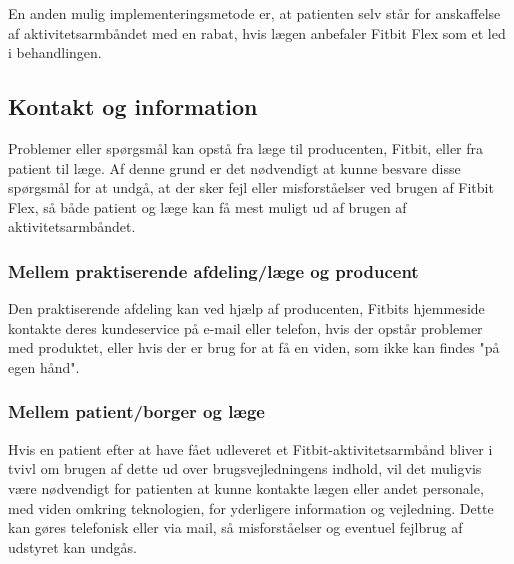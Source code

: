 En anden mulig implementeringsmetode er, at patienten selv står for anskaffelse af aktivitetsarmbåndet med en rabat, hvis lægen anbefaler Fitbit Flex som et led i behandlingen.  

\subsection{Kontakt og information}

Problemer eller spørgsmål kan opstå fra læge til producenten, Fitbit, eller fra patient til læge. Af denne grund er det nødvendigt at kunne besvare disse spørgsmål for at undgå, at der sker fejl eller misforståelser ved brugen af Fitbit Flex, så både patient og læge kan få mest muligt ud af brugen af aktivitetsarmbåndet. 

\subsubsection{Mellem praktiserende afdeling/læge og producent}

Den praktiserende afdeling kan ved hjælp af producenten, Fitbits hjemmeside kontakte deres kundeservice på e-mail eller telefon, hvis der opstår problemer med produktet, eller hvis der er brug for at få en viden, som ikke kan findes "på egen hånd". 

\subsubsection{Mellem patient/borger og læge}

Hvis en patient efter at have fået udleveret et Fitbit-aktivitetsarmbånd bliver i tvivl om brugen af dette ud over brugsvejledningens indhold, vil det muligvis være nødvendigt for patienten at kunne kontakte lægen eller andet personale, med viden omkring teknologien, for yderligere information og vejledning. Dette kan gøres telefonisk eller via mail, så misforståelser og eventuel fejlbrug af udstyret kan undgås. 


